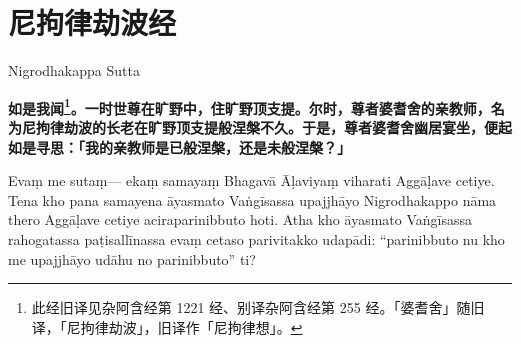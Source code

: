 \section{尼拘律劫波经}

\begin{center}Nigrodhakappa Sutta\end{center}\vspace{1em}

\textbf{如是我闻\footnote{此经旧译见杂阿含经第 1221 经、别译杂阿含经第 255 经。「婆耆舍」随旧译，「尼拘律劫波」，旧译作「尼拘律想」。}。一时世尊在旷野中，住旷野顶支提。尔时，尊者婆耆舍的亲教师，名为尼拘律劫波的长老在旷野顶支提般涅槃不久。于是，尊者婆耆舍幽居宴坐，便起如是寻思：「我的亲教师是已般涅槃，还是未般涅槃？」}

Evaṃ me sutaṃ— ekaṃ samayaṃ Bhagavā Āḷaviyaṃ viharati Aggāḷave cetiye. Tena kho pana samayena āyasmato Vaṅgīsassa upajjhāyo Nigrodhakappo nāma thero Aggāḷave cetiye aciraparinibbuto hoti. Atha kho āyasmato Vaṅgīsassa rahogatassa paṭisallīnassa evaṃ cetaso parivitakko udapādi: “parinibbuto nu kho me upajjhāyo udāhu no parinibbuto” ti?

